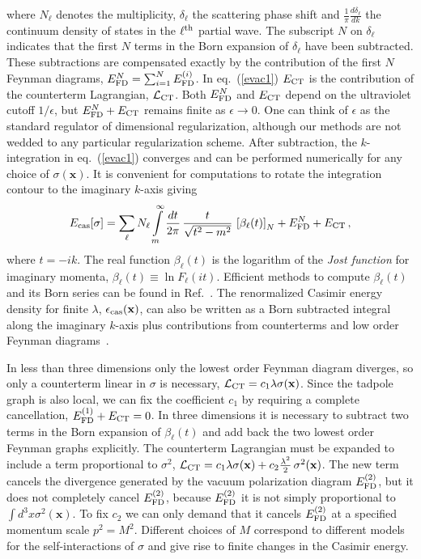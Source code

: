 \documentclass[a4paper,aps,amsfonts,prl,showpacs,nobibnotes,nofootinbib,%
tightenlines,twocolumn]{revtex4}
\newcommand{\vek}[1]{\mathbf{#1}}
\begin{document}
%
where $N_\ell$ denotes the multiplicity, $\delta_{\ell}$ the
scattering phase shift and $\frac{1}{\pi} \frac{d\delta_{\ell}}{dk}$
the continuum density of states in the $\ell^{\rm th}$ partial wave. 
The subscript $N$ on $\delta_{\ell}$ indicates that the first $N$
terms in the Born expansion of $\delta_{\ell}$ have been subtracted. 
These subtractions are compensated exactly by the contribution of the
first $N$ Feynman diagrams, $E^{N}_{\rm FD}=\sum_{i=1}^{N}E_{\rm
FD}^{(i)}$.  In eq.~(\ref{evac1}) $E_{\rm CT}$ is the contribution of
the counterterm Lagrangian, ${\cal L}_{\rm CT}$.  Both $E^{N}_{\rm
FD}$ and $E_{\rm CT}$ depend on the ultraviolet cutoff $1/\epsilon$,
but $E_{\rm FD}^{N} + E_{\rm CT}$ remains finite as $\epsilon\to 0$. 
One can think of $\epsilon$ as the standard regulator of dimensional
regularization, although our methods are not wedded to any particular
regularization scheme.  After subtraction, the $k$-integration in
eq.~(\ref{evac1}) converges and can be performed numerically for any
choice of $\sigma(\vek x)$.  It is convenient for computations to
rotate the integration contour to the imaginary $k$-axis giving
%
\begin{equation}
E_{\rm cas}[\sigma]=\sum\limits_{\ell} N_\ell \int\limits_m^\infty
\frac{d t}{2\pi}\,\frac{t}{\sqrt{t^2-m^2}}\,
\left[\beta_\ell(t)\right]_{N}
+ E_{\rm FD}^{N} + E_{\rm CT} \,,
\label{master}
\end{equation}
%
where $t=-ik$.  The real function $\beta_\ell(t)$ is
the logarithm of the \emph{Jost function} for imaginary momenta,
$\beta_\ell(t) \equiv \ln F_\ell(it)$.  Efficient methods to compute
$\beta_\ell(t)$ and its Born series can be found in Ref.~\cite{dens}. 
The renormalized Casimir energy density for finite $\lambda$,
$\epsilon_{\rm cas}(\vek x)$, can also be written as a Born subtracted
integral along the imaginary $k$-axis plus contributions from
counterterms and low order Feynman diagrams~\cite{dens}.

In less than three dimensions only the lowest order Feynman diagram
diverges, so only a counterterm linear in $\sigma$ is necessary,
$\mathcal{L}_{\rm CT} = c_1\lambda\sigma(\vek{x})$.  Since the tadpole
graph is also local, we can fix the coefficient $c_1$ by requiring a
complete cancellation, $E_{\rm FD}^{(1)} + E_{\rm CT} = 0$.  In three
dimensions it is necessary to subtract two terms in the Born expansion
of $\beta_{\ell}(t)$ and add back the two lowest order Feynman graphs
explicitly.  The counterterm Lagrangian must be expanded to include a
term proportional to $\sigma^{2}$, ${\cal L}_{\rm CT} =
c_1\lambda\sigma(\vek{x}) + c_2\frac{\lambda^2}{2}\,
\sigma^2(\vek{x})$.  The new term cancels the divergence generated by
the vacuum polarization diagram $E_{\rm FD}^{(2)}$, but it does not
completely cancel $E_{\rm FD}^{(2)}$, because $E_{\rm FD}^{(2)}$ it is
not simply proportional to $\int d^{3}x \sigma^{2}(\vek x)$.  To fix
$c_2$ we can only demand that it cancels $E_{\rm FD}^{(2)}$ at a
specified momentum scale $p^2 = M^2$.  Different choices of $M$
correspond to different models for the self-interactions of $\sigma$
and give rise to finite changes in the Casimir energy.  
\end{document}
